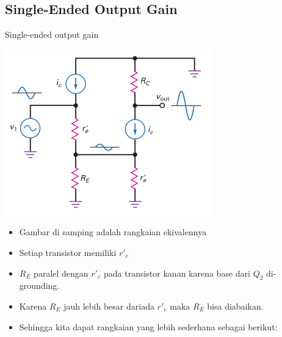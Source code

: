 \documentclass[aspectratio=169]{beamer}
\begin{document}
\subsection{Single-Ended Output Gain}
\begin{frame}{Single-ended output gain}
	\begin{multicols}{2}
		\begin{center}
			\includegraphics[height=0.7\textheight]{gambar/01.ac_equivalent_circuit}
		\end{center}
		\columnbreak
		\begin{itemize}
			\item Gambar di samping adalah rangkaian ekivalennya
			\item Setiap transistor memiliki $ r'_e $
			\item $ R_E $ paralel dengan $ r'_e $ pada transistor kanan karena base dari $ Q_2 $ di-grounding.
			\item Karena $ R_E $ jauh lebih besar dariada $ r'_e $ maka $ R_E $ bisa diabaikan.
			\item Sehingga kita dapat rangkaian yang lebih sederhana sebagai berikut:
		\end{itemize}
	\end{multicols}
\end{frame}
\end{document}
